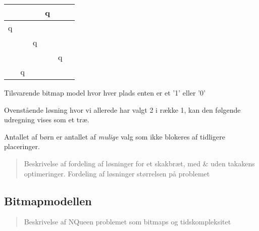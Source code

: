 \documentclass[draft,a4paper,10pt]{article}
\def\chs#1{{\chessfont#1}}
\begin{document}
\begin{tabular}{|c|c|c|c|c|c}
\hline	 &  & &   \chs{q} & \\
\hline	\chs{q} & &  &  & \\
\hline	 & & \chs{q} &  &  \\
\hline	 &  &  & & \chs{q} \\
\hline	 & \chs{q} & &  &  \\
\hline
\end{tabular}


Tilsvarende bitmap model hvor hver plads enten er et '1' eller '0'





Ovenstående løsning hvor vi allerede har valgt 2 i række 1, kan den følgende udregning vises som et træ.

Antallet af børn er antallet af \textit{mulige} valg som ikke blokeres af tidligere placeringer.

\begin{verse}
Beskrivelse af fordeling af løsninger for et skakbræt, med & uden takakens optimeringer. Fordeling af løsninger størrelsen på problemet
\end{verse}




\subsection{Bitmapmodellen}\label{bitmapmodellen}
\begin{verse}
	Beskrivelse af NQueen problemet som bitmaps og tidskompleksitet
\end{verse}
\end{document}
